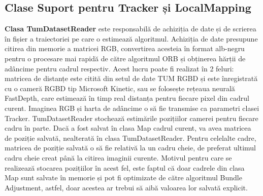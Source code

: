 \documentclass[12pt,a4paper]{report}
\begin{document}
\subsection{Clase Suport pentru Tracker și LocalMapping}
\textbf{Clasa TumDatasetReader} este responsabilă de achiziția de date și de scrierea 
în fișier a traiectoriei pe care o estimează algoritmul. Achiziția de date 
presupune citirea din memorie a matricei RGB, convertirea acesteia în format alb-negru pentru 
o procesare mai rapidă de către algoritmul ORB și obținerea hărții de adâncime pentru 
cadrul respectiv. Acest lucru poate fi realizat în 2 feluri: matricea de distanțe este citită
din setul de date TUM RGBD și este înregistrată cu o cameră RGBD tip Microsoft Kinetic,
sau se folosește rețeaua neurală FastDepth, care estimează în timp real distanța pentru
fiecare pixel din cadrul curent. Imaginea RGB și harta de adâncime
o să fie transmise ca parametri clasei Tracker. TumDatasetReader stochează estimările 
pozițiilor camerei pentru fiecare cadru în parte. Dacă a fost salvat în clasa Map cadrul curent,
va avea matricea de poziție salvată, nealterată în clasa TumDatasetReader. Pentru celelalte cadre,
matricea de poziție salvată o să fie relativă la un cadru cheie, de preferat ultimul cadru cheie creat până
la citirea imaginii curente. Motivul pentru care se realizează stocarea pozițiilor în acest 
fel, este faptul că doar cadrele din clasa Map sunt salvate în memorie și pot fi optimizate 
de către algoritmul Bundle Adjustment, astfel, doar acestea ar trebui să aibă valoarea lor 
salvată explicit. \\
\end{document}

